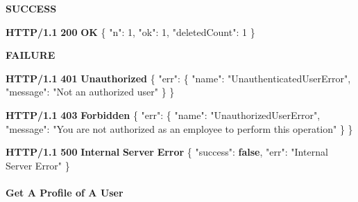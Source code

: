\documentclass[
]{article}
\newenvironment{Shaded}{}{}
\newcommand{\DataTypeTok}[1]{\textcolor[rgb]{0.56,0.13,0.00}{#1}}
\newcommand{\DecValTok}[1]{\textcolor[rgb]{0.25,0.63,0.44}{#1}}
\newcommand{\ErrorTok}[1]{\textcolor[rgb]{1.00,0.00,0.00}{\textbf{#1}}}
\newcommand{\FunctionTok}[1]{\textcolor[rgb]{0.02,0.16,0.49}{#1}}
\newcommand{\KeywordTok}[1]{\textcolor[rgb]{0.00,0.44,0.13}{\textbf{#1}}}
\newcommand{\StringTok}[1]{\textcolor[rgb]{0.25,0.44,0.63}{#1}}
\begin{document}
\textbf{SUCCESS}

\begin{Shaded}
\begin{Highlighting}[]
\ErrorTok{HTTP/1.1} \ErrorTok{200} \ErrorTok{OK}
\FunctionTok{\{}
    \DataTypeTok{"n"}\FunctionTok{:} \DecValTok{1}\FunctionTok{,}
    \DataTypeTok{"ok"}\FunctionTok{:} \DecValTok{1}\FunctionTok{,}
    \DataTypeTok{"deletedCount"}\FunctionTok{:} \DecValTok{1}
\FunctionTok{\}}
\end{Highlighting}
\end{Shaded}

\textbf{FAILURE}

\begin{Shaded}
\begin{Highlighting}[]
\ErrorTok{HTTP/1.1} \ErrorTok{401} \ErrorTok{Unauthorized}
\FunctionTok{\{}
    \DataTypeTok{"err"}\FunctionTok{:} \FunctionTok{\{}
        \DataTypeTok{"name"}\FunctionTok{:} \StringTok{"UnauthenticatedUserError"}\FunctionTok{,}
        \DataTypeTok{"message"}\FunctionTok{:} \StringTok{"Not an authorized user"}
    \FunctionTok{\}}
\FunctionTok{\}}
\end{Highlighting}
\end{Shaded}

\begin{Shaded}
\begin{Highlighting}[]
\ErrorTok{HTTP/1.1} \ErrorTok{403} \ErrorTok{Forbidden}
\FunctionTok{\{}
    \DataTypeTok{"err"}\FunctionTok{:} \FunctionTok{\{}
        \DataTypeTok{"name"}\FunctionTok{:} \StringTok{"UnauthorizedUserError"}\FunctionTok{,}
        \DataTypeTok{"message"}\FunctionTok{:} \StringTok{"You are not authorized as an employee to perform this operation"}
    \FunctionTok{\}}
\FunctionTok{\}}
\end{Highlighting}
\end{Shaded}

\begin{Shaded}
\begin{Highlighting}[]
\ErrorTok{HTTP/1.1} \ErrorTok{500} \ErrorTok{Internal} \ErrorTok{Server} \ErrorTok{Error}
\FunctionTok{\{}
    \DataTypeTok{"success"}\FunctionTok{:} \KeywordTok{false}\FunctionTok{,}
    \DataTypeTok{"err"}\FunctionTok{:} \StringTok{"Internal Server Error"}
\FunctionTok{\}}
\end{Highlighting}
\end{Shaded}

\hypertarget{header-n373}{%
\paragraph{Get A Profile of A User}\label{header-n373}}
\end{document}

